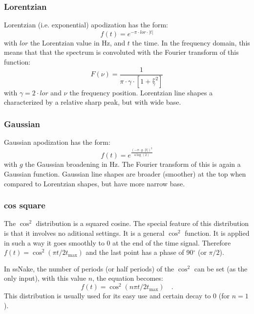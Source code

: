 \documentclass[11pt,a4paper]{article}
\begin{document}
\subsubsection{Lorentzian}
Lorentzian (i.e. exponential) apodization has the form:
\begin{equation}
  f(t) = e^{-\pi \cdot lor \cdot |t|}
\end{equation}
with $lor$ the Lorentzian value in Hz, and $t$ the time. In the frequency domain, this means that that the
spectrum is convoluted with the Fourier transform of this function:
\begin{equation}
  F(\nu) = \frac{1}{\pi \cdot \gamma \cdot \left[ 1 + \frac{\nu}{\gamma}^2 \right]}
\end{equation}
with $\gamma = 2 \cdot lor$ and $\nu$ the frequency position. Lorentzian line shapes a characterized by a relative sharp peak, but with wide base.

\subsubsection{Gaussian}
Gaussian apodization has the form:
\begin{equation}
  f(t) = e^{\frac{(-\pi \cdot g \cdot |t|)^2}{4 \log(2)} }
\end{equation}
with $g$ the Gaussian broadening in Hz. The Fourier transform of this is again a Gaussian function. Gaussian line shapes are broader (smoother) at the top when compared to Lorentzian shapes, but have more narrow base.

\subsubsection{cos square}
The $\cos^2$ distribution is a squared cosine. The special feature of this distribution is that it involves no aditional settings. It is a general $\cos^2$ function. It is applied in such a way it goes smoothly to 0 at the end of the time signal. Therefore $f(t) = \cos^2(\pi t/2t_\text{max})$ and the last point has a phase of 90$^\circ$ (or $\pi/2$).

In ssNake, the number of periods (or half periods) of the $\cos^2$ can be set (as the only input), with this value $n$, the equation becomes:
\begin{equation}
  f(t) = \cos^2(n\pi  t/2t_\text{max}) \quad .
\end{equation}
This distribution is usually used for its easy use and certain decay to 0 (for $n = 1$).
\end{document}
